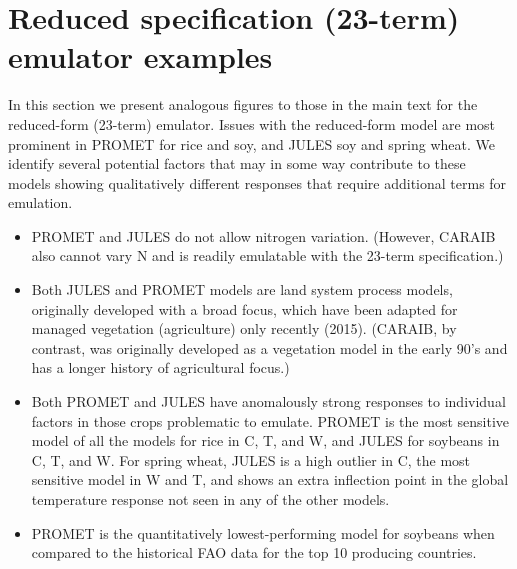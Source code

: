 \documentclass[12pt]{article}
\begin{document}
\section{Reduced specification (23-term) emulator examples}
\smallskip
\begin{flushleft}
In this section we present analogous figures to those in the main text for the reduced-form (23-term) emulator. 
Issues with the reduced-form model are most prominent in PROMET for rice and soy, and JULES soy and spring wheat. 
We identify several potential factors that may in some way contribute to these models showing qualitatively different responses that require additional terms for emulation.
	\begin{itemize}
		\item PROMET and JULES do not allow nitrogen variation. (However, CARAIB also cannot vary N and is readily emulatable with the 23-term specification.) 
		\item Both JULES and PROMET models are land system process models, originally developed with a broad focus, which have been adapted for managed vegetation (agriculture) only recently (2015). (CARAIB, by contrast, was originally developed as a vegetation model in the early 90's and has a longer history of agricultural focus.)
		\item Both PROMET and JULES have anomalously strong responses to individual factors in those crops problematic to emulate. PROMET is the most sensitive model of all the models for rice in C, T, and W, and JULES for soybeans in C, T, and W. For spring wheat, JULES is a high outlier in C, the most sensitive model in W and T, and shows an extra inflection point in the global temperature response not seen in any of the other models.
		\item PROMET is the quantitatively lowest-performing model for soybeans when compared to the historical FAO data for the top 10 producing countries. 
		\end{itemize}
\end{flushleft}
\end{document}
